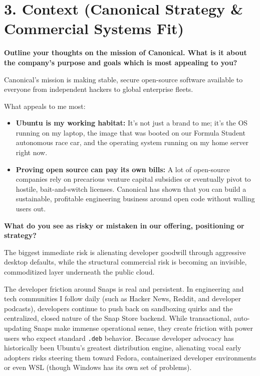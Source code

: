 \documentclass[letterpaper,11pt]{article}
\newcommand{\interviewQuestion}[1]{%
  \vspace{8pt}%
  \textbf{\color{airforceblue}#1}\par%
}
\begin{document}
\vspace{10pt}
\section*{3. Context (Canonical Strategy \& Commercial Systems Fit)}

\interviewQuestion{Outline your thoughts on the mission of Canonical. What is it about the company's purpose and goals which is most appealing to you?}

Canonical's mission is making stable, secure open-source software available to everyone from independent hackers to global enterprise fleets.

What appeals to me most:
\begin{itemize}[leftmargin=0.2in, itemsep=3pt]
    \item \textbf{Ubuntu is my working habitat:} It's not just a brand to me; it's the OS running on my laptop, the image that was booted on our Formula Student autonomous race car, and the operating system running on my home server right now.
    \item \textbf{Proving open source can pay its own bills:} A lot of open-source companies rely on precarious venture capital subsidies or eventually pivot to hostile, bait-and-switch licenses. Canonical has shown that you can build a sustainable, profitable engineering business around open code without walling users out.
\end{itemize}

\interviewQuestion{What do you see as risky or mistaken in our offering, positioning or strategy?}

The biggest immediate risk is alienating developer goodwill through aggressive desktop defaults, while the structural commercial risk is becoming an invisible, commoditized layer underneath the public cloud.

The developer friction around Snaps is real and persistent. In engineering and tech communities I follow daily (such as Hacker News, Reddit, and developer podcasts), developers continue to push back on sandboxing quirks and the centralized, closed nature of the Snap Store backend. While transactional, auto-updating Snaps make immense operational sense, they create friction with power users who expect standard \texttt{.deb} behavior. Because developer advocacy has historically been Ubuntu's greatest distribution engine, alienating vocal early adopters risks steering them toward Fedora, containerized developer environments or even WSL (though Windows has its own set of problems).
\end{document}
